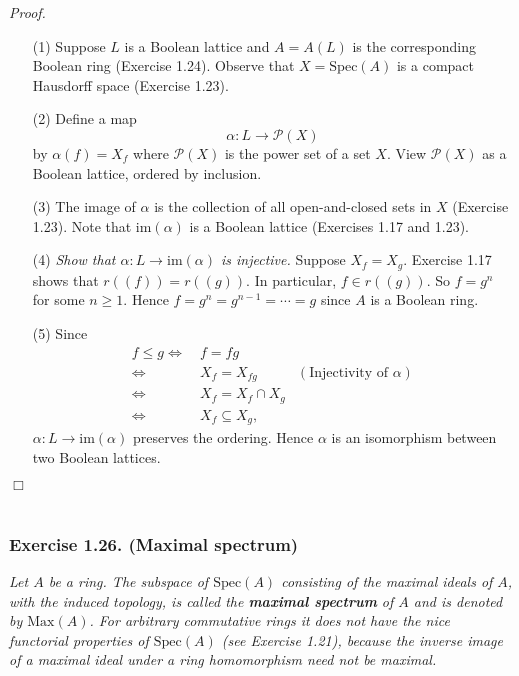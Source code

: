 \documentclass{article}
\begin{document}
\emph{Proof.}
\begin{enumerate}
\item[(1)]
  Suppose $L$ is a Boolean lattice and $A = A(L)$ is the corresponding Boolean ring (Exercise 1.24).
  Observe that $X = \mathrm{Spec}(A)$ is a compact Hausdorff space (Exercise 1.23).

\item[(2)]
  Define a map
  \[
    \alpha: L \to \mathcal{P}(X)
  \]
  by $\alpha(f) = X_f$
  where $\mathcal{P}(X)$ is the power set of a set $X$.
  View $\mathcal{P}(X)$ as a Boolean lattice, ordered by inclusion.
  
\item[(3)]
  The image of $\alpha$ is the collection of all open-and-closed sets in $X$ (Exercise 1.23).
  Note that $\mathrm{im}(\alpha)$ is a Boolean lattice (Exercises 1.17 and 1.23).

\item[(4)]
  \emph{Show that $\alpha: L \to \mathrm{im}(\alpha)$ is injective.}
  Suppose $X_f = X_g$.
  Exercise 1.17 shows that $r((f)) = r((g))$.
  In particular, $f \in r((g))$.
  So $f = g^n$ for some $n \geq 1$.
  Hence $f = g^n = g^{n-1} = \cdots = g$ since $A$ is a Boolean ring.

\item[(5)]
  Since
  \begin{align*}
    f \leq g
    \Longleftrightarrow & \:
    f = fg \\
    \Longleftrightarrow & \:
    X_f = X_{fg}
      &(\text{Injectivity of $\alpha$}) \\
    \Longleftrightarrow & \:
    X_f = X_f \cap X_g \\
    \Longleftrightarrow & \:
    X_f \subseteq X_g,
  \end{align*}
  $\alpha: L \to \mathrm{im}(\alpha)$ preserves the ordering.
  Hence $\alpha$ is an isomorphism between two Boolean lattices. 
\end{enumerate}
$\Box$ \\\\






\subsubsection*{Exercise 1.26. (Maximal spectrum)}
\emph{Let $A$ be a ring.
The subspace of $\mathrm{Spec}(A)$ consisting of the maximal ideals of $A$,
with the induced topology,
is called the \textbf{maximal spectrum} of $A$ and is denoted by $\mathrm{Max}(A)$.
For arbitrary commutative rings
it does not have the nice functorial properties of $\mathrm{Spec}(A)$ (see Exercise 1.21),
because the inverse image of a maximal ideal under a ring homomorphism need not be maximal.} \\
\end{document}
